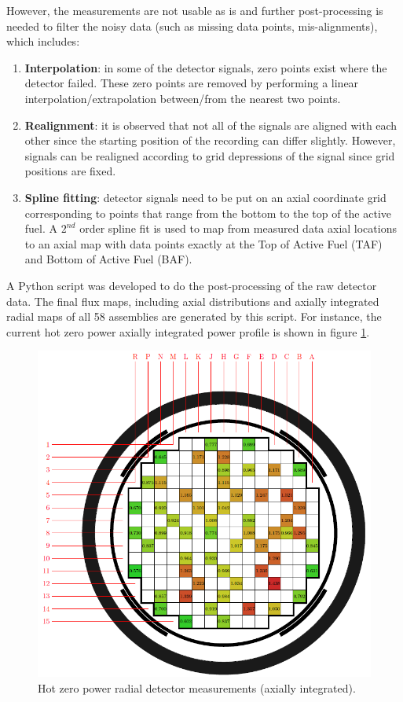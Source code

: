 \documentclass{article}
\begin{document}
However, the measurements are not usable as is and further post-processing is needed to filter the noisy data (such as missing data points, mis-alignments), which includes:

\begin{enumerate}
\item \textbf{Interpolation}: in some of the detector signals, zero points exist where the detector failed. These zero points are removed by performing a linear interpolation/extrapolation between/from the nearest two points.

\item \textbf{Realignment}: it is observed that not all of the signals are aligned with each other since the starting position of the recording can differ slightly. However, signals can be realigned according to grid depressions of the signal since grid positions are fixed.

\item \textbf{Spline fitting}: detector signals need to be put on an axial coordinate grid corresponding to points that range from the bottom to the top of the active fuel. A $2^{nd}$ order spline fit is used to map from measured data axial locations to an axial map with data points exactly at the Top of Active Fuel (TAF) and Bottom of Active Fuel (BAF).
\end{enumerate}

A Python script was developed to do the post-processing of the raw detector data. The final flux maps, including axial distributions and axially integrated radial maps of all 58 assemblies are generated by this script. For instance, the current hot zero power axially integrated power profile is shown in figure  \ref{fig:fig_hzp_map}.

\begin{figure}[ht]
\centering
\includegraphics[keepaspectratio, width = 4.0 in]{figures/hzp_map}
\caption{Hot zero power radial detector measurements (axially integrated).}
\label{fig:fig_hzp_map}
\end{figure}
\end{document}
